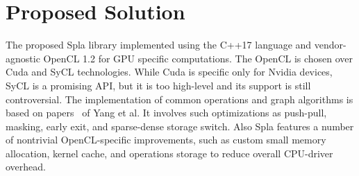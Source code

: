 \section{Proposed Solution}

The proposed Spla library implemented using the C++17 language and  vendor-agnostic OpenCL 1.2 for GPU specific computations. The OpenCL is chosen over Cuda and SyCL technologies. While Cuda is specific only for Nvidia devices, SyCL is a promising API, but it is too high-level and its support is still controversial. The implementation of common operations and graph algorithms is based on papers~\cite{7284398:spvspm, https://doi.org/10.48550/arxiv.1804.03327:pushpull, yang2019graphblast} of Yang et al. It involves such optimizations as push-pull, masking, early exit, and sparse-dense storage switch. Also Spla features a number of nontrivial OpenCL-specific improvements, such as custom small memory allocation, kernel cache, and operations storage to reduce overall CPU-driver overhead.